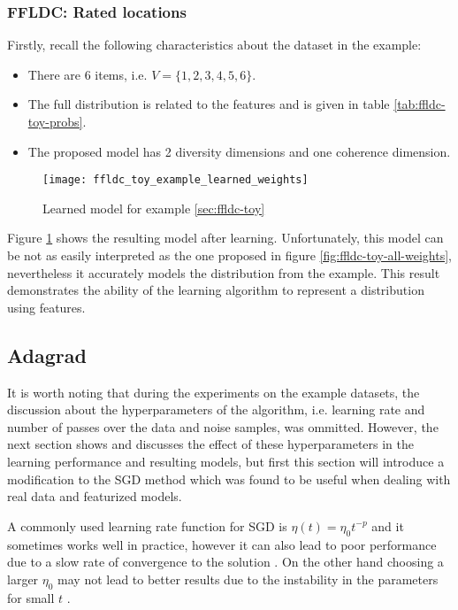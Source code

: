 \subsubsection{FFLDC: Rated locations}

Firstly, recall the following characteristics about the dataset in the example:

\begin{itemize}
  \item There are 6 items, i.e. $V = \{1,2,3,4,5,6\}$.
  \item The full distribution is related to the features and is given in table \ref{tab:ffldc-toy-probs}.
  \item The proposed model has 2 diversity dimensions and one coherence dimension.
\end{itemize}

\begin{figure}
  \centering
  \texttt{[image: ffldc\_toy\_example\_learned\_weights]}
  \caption{Learned model for example \ref{sec:ffldc-toy}}
  \label{fig:ffldc-toy-learned-weights}
\end{figure}

Figure \ref{fig:ffldc-toy-learned-weights} shows the resulting model after learning. Unfortunately, this model can be not as easily interpreted as the one proposed in figure \ref{fig:ffldc-toy-all-weights}, nevertheless it accurately models the distribution from the example. This result demonstrates the ability of the learning algorithm to represent a distribution using features.

\subsection{Adagrad}
\label{sec:adagrad}

It is worth noting that during the experiments on the example datasets, the discussion about the hyperparameters of the algorithm, i.e. learning rate and number of passes over the data and noise samples, was ommitted. However, the next section shows and discusses the effect of these hyperparameters in the learning performance and resulting models, but first this section will introduce a modification to the SGD method which was found to be useful when dealing with real data and featurized models.

A commonly used learning rate function for SGD is $\eta(t) = \eta_{0}t^{-p}$ and it sometimes works well in practice, however it can also lead to poor performance due to a slow rate of convergence to the solution \citep{darken1992towards}. On the other hand choosing a larger $\eta_{0}$ may not lead to better results due to the instability in the parameters for small $t$ \citep{Darken1990}.

